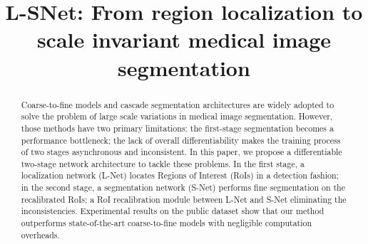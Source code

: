 \documentclass{article}
\title{L-SNet: From region localization to scale invariant medical image segmentation }
\begin{document}
%
\maketitle
%
\begin{abstract}
\vspace{-3pt}
Coarse-to-fine models and cascade segmentation architectures are widely adopted to solve the problem of large scale variations in medical image segmentation. 
However, those methods have two primary limitations: the first-stage segmentation becomes a performance bottleneck; the lack of overall differentiability makes the training process of two stages asynchronous and inconsistent. In this paper, we propose a differentiable two-stage network architecture to tackle these problems. In the first stage, a localization network (L-Net) locates Regions of Interest (RoIs) in a detection fashion; in the second stage, a segmentation network (S-Net) performs fine segmentation on the recalibrated RoIs; a RoI recalibration module between L-Net and S-Net 
eliminating the inconsistencies.
Experimental results on the public dataset show that our method outperforms state-of-the-art coarse-to-fine models with negligible computation overheads. 





\end{abstract}
\end{document}
